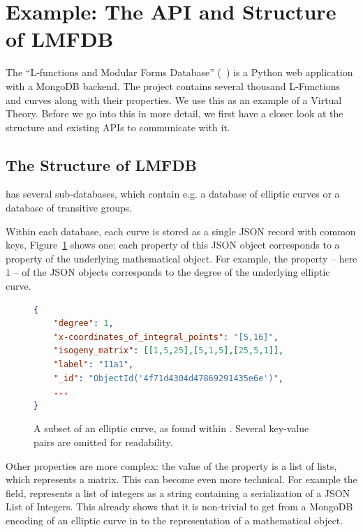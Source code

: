 \section{Example: The API and Structure of LMFDB}\label{sec:sota}

The ``L-functions and Modular Forms Database'' (\lmfdb~\cite{lmfdb}) is a Python web application with a MongoDB backend. 
The project contains several thousand L-Functions and curves along with their properties. 
We use this as an example of a Virtual Theory. 
Before we go into this in more detail, we first have a closer look at the structure and existing APIs to communicate with it.

\subsection{The Structure of LMFDB}\label{sec:sota:struct}

\lmfdb has several sub-databases, which contain e.g. a database of elliptic curves or a database of transitive groups. 

Within each database, each curve is stored as a single JSON record with common keys, Figure~\ref{fig:lmfdbexample} shows one: each property of this JSON object corresponds to a property of the underlying mathematical object. 
For example, the  property -- here $1$ -- of the JSON objects corresponds to the degree of the underlying elliptic curve. 

\begin{figure}[ht]\centering
\begin{lstlisting}[language=json]
{
    "degree": 1,
    "x-coordinates_of_integral_points": "[5,16]",
    "isogeny_matrix": [[1,5,25],[5,1,5],[25,5,1]],
    "label": "11a1",
    "_id": "ObjectId('4f71d4304d47869291435e6e')",
    ...
}
\end{lstlisting}\vspace*{-1.5em}
  \caption[An elliptic curve from \lmfdb]{
    A subset of an elliptic curve, as found within \lmfdb. 
    Several key-value pairs are omitted for readability. 
  }
  \label{fig:lmfdbexample}
\end{figure}

Other properties are more complex: the value of the  property is a list of lists, which represents a matrix. 
This can become even more technical. 
For example the  field, \lmfdb represents a list of integers as a string containing a serialization of a JSON List of Integers. 
This already shows that it is non-trivial to get from a MongoDB encoding of an elliptic curve in \lmfdb to the representation of a mathematical object. 


